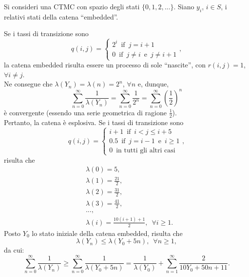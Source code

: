 \documentclass[12pt]{homework}
\begin{document}
\begin{alphaparts}
  \end{alphaparts}
  
  \newpage
  \section{}%
  Si consideri una CTMC con spazio degli stati $\{0,1,2,...\}$. Siano $y_{i}$, $i\in S$, i relativi stati della catena ``embedded''.
  \begin{alphaparts}
  \questionpart
  Se i tassi di transizione sono
  \begin{equation*}
  q\left(i,j\right)=\begin{cases}2^{i} \,\,\,\text{if}\,\,\,j=i+1\\0 \,\,\,\text{if}\,\,\,j\neq i\,\,\,\text{e}\,\,\,j\neq i+1\end{cases},
  \end{equation*}
 la catena embedded risulta essere un processo di sole ``nascite'', con $r\left(i,j\right)=1$, $\forall i \neq j$.\\
  Ne consegue che $\lambda\left(Y_{n}\right)=\lambda\left(n\right)=2^{n}$, $\forall n$ e, dunque,
  \begin{equation*}
  \sum_{n=0}^{\infty}\frac{1}{\lambda\left(Y_{n}\right)}=\sum_{n=0}^{\infty}\frac{1}{2^{n}}=\sum_{n=0}^{\infty}\left(\frac{1}{2}\right)^{n}
  \end{equation*}
  è convergente (essendo una serie geometrica di ragione $\frac{1}{2}$).\\
  Pertanto, la catena è esplosiva.
  \questionpart
  Se i tassi di transizione sono
  \begin{equation*}
  q\left(i,j\right)=\begin{cases}i+1 \,\,\,\text{if}\,\,\,i<j\leq i+5\\0.5 \,\,\,\text{if}\,\,\,j=i-1\,\,\,\text{e}\,\,\,i\geq 1\\0 \,\,\, \text{in tutti gli altri casi}\end{cases},
  \end{equation*}
  risulta che
  \begin{align*}
&\lambda\left(0\right)= 5,\\
&\lambda\left(1\right)= \frac{21}{2},\\
&\lambda\left(2\right)= \frac{31}{2},\\
&\lambda\left(3\right)=\frac{41}{2},\\
&...,\\
&\lambda\left(i\right)=\frac{10\left(i+1\right)+1}{2},\,\,\, \forall i\geq 1.
\end{align*}
Posto $Y_{0}$ lo stato iniziale della catena embedded, risulta che
\begin{equation*}
\lambda\left(Y_{n}\right)\leq \lambda\left(Y_{0}+5n\right),\,\,\, \forall n\geq 1,
\end{equation*} 
da cui:
\begin{equation*}
\sum_{n=0}^{\infty}\frac{1}{\lambda\left(Y_{n}\right)}\geq \sum_{n=0}^{\infty}\frac{1}{\lambda\left(Y_{0}+5n\right)}=\frac{1}{\lambda\left(Y_{0}\right)}+\sum_{n=1}^{\infty}\frac{2}{10Y_{0}+50n+11}.
\end{equation*}


\end{alphaparts}
\end{document}
